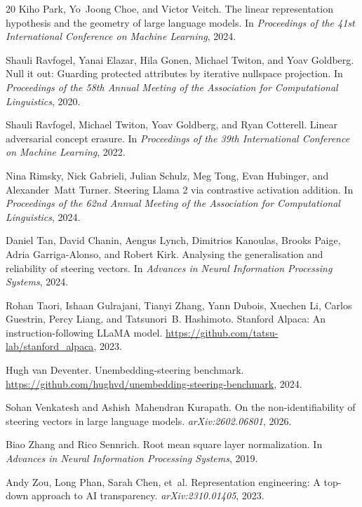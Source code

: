 \begin{thebibliography}{20}
Kiho Park, Yo~Joong Choe, and Victor Veitch.
\newblock The linear representation hypothesis and the geometry of large language models.
\newblock In \emph{Proceedings of the 41st International Conference on Machine Learning}, 2024.

Shauli Ravfogel, Yanai Elazar, Hila Gonen, Michael Twiton, and Yoav Goldberg.
\newblock Null it out: Guarding protected attributes by iterative nullspace projection.
\newblock In \emph{Proceedings of the 58th Annual Meeting of the Association for Computational Linguistics}, 2020.

Shauli Ravfogel, Michael Twiton, Yoav Goldberg, and Ryan Cotterell.
\newblock Linear adversarial concept erasure.
\newblock In \emph{Proceedings of the 39th International Conference on Machine Learning}, 2022.

Nina Rimsky, Nick Gabrieli, Julian Schulz, Meg Tong, Evan Hubinger, and Alexander~Matt Turner.
\newblock Steering {Llama} 2 via contrastive activation addition.
\newblock In \emph{Proceedings of the 62nd Annual Meeting of the Association for Computational Linguistics}, 2024.

Daniel Tan, David Chanin, Aengus Lynch, Dimitrios Kanoulas, Brooks Paige, Adria Garriga-Alonso, and Robert Kirk.
\newblock Analysing the generalisation and reliability of steering vectors.
\newblock In \emph{Advances in Neural Information Processing Systems}, 2024.

Rohan Taori, Ishaan Gulrajani, Tianyi Zhang, Yann Dubois, Xuechen Li, Carlos Guestrin, Percy Liang, and Tatsunori~B. Hashimoto.
\newblock Stanford {Alpaca}: An instruction-following {LLaMA} model.
\newblock \url{https://github.com/tatsu-lab/stanford_alpaca}, 2023.

Hugh van Deventer.
\newblock Unembedding-steering benchmark.
\newblock \url{https://github.com/hughvd/unembedding-steering-benchmark}, 2024.

Sohan Venkatesh and Ashish~Mahendran Kurapath.
\newblock On the non-identifiability of steering vectors in large language models.
\newblock \emph{arXiv:2602.06801}, 2026.

Biao Zhang and Rico Sennrich.
\newblock Root mean square layer normalization.
\newblock In \emph{Advances in Neural Information Processing Systems}, 2019.

Andy Zou, Long Phan, Sarah Chen, et~al.
\newblock Representation engineering: A top-down approach to {AI} transparency.
\newblock \emph{arXiv:2310.01405}, 2023.

\end{thebibliography}
